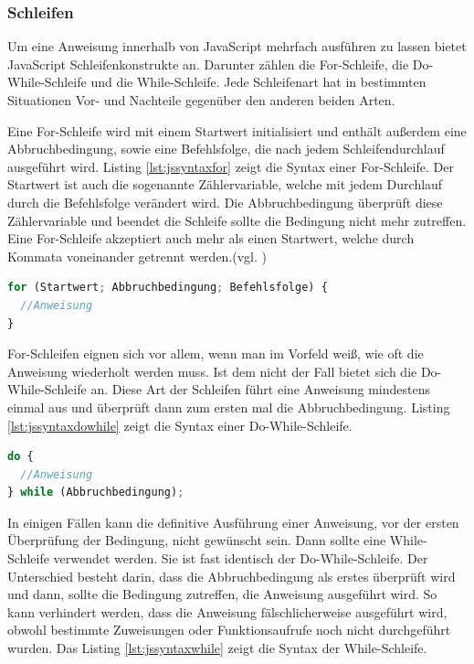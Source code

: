\subsubsection{Schleifen} Um eine Anweisung innerhalb von JavaScript mehrfach ausführen zu lassen bietet JavaScript Schleifenkonstrukte an. Darunter zählen die For-Schleife, die Do-While-Schleife und die While-Schleife. Jede Schleifenart hat in bestimmten Situationen Vor- und Nachteile gegenüber den anderen beiden Arten.\par Eine For-Schleife wird mit einem Startwert initialisiert und enthält außerdem eine Abbruchbedingung, sowie eine Befehlsfolge, die nach jedem Schleifendurchlauf ausgeführt wird. Listing \ref{lst:jssyntaxfor} zeigt die Syntax einer For-Schleife. Der Startwert ist auch die sogenannte Zählervariable, welche mit jedem Durchlauf durch die Befehlsfolge verändert wird. Die Abbruchbedingung überprüft diese Zählervariable und beendet die Schleife sollte die Bedingung nicht mehr zutreffen. Eine For-Schleife akzeptiert auch mehr als einen Startwert, welche durch Kommata voneinander getrennt werden.(vgl. \cite[S.75f]{WenzJava2008})

\vspace{1em}
\begin{lstlisting}[language=JavaScript, caption=Syntax For-Schleife, label=lst:jssyntaxfor]
for (Startwert; Abbruchbedingung; Befehlsfolge) {
  //Anweisung
}
\end{lstlisting}
	
For-Schleifen eignen sich vor allem, wenn man im Vorfeld weiß, wie oft die Anweisung wiederholt werden muss. Ist dem nicht der Fall bietet sich die Do-While-Schleife an. Diese Art der Schleifen führt eine Anweisung mindestens einmal aus und überprüft dann zum ersten mal die Abbruchbedingung. Listing \ref{lst:jssyntaxdowhile} zeigt die Syntax einer Do-While-Schleife.

\vspace{1em}
\begin{lstlisting}[language=JavaScript, caption=Syntax Do-While-Schleife, label=lst:jssyntaxdowhile]
do {
  //Anweisung
} while (Abbruchbedingung);
\end{lstlisting}

In einigen Fällen kann die definitive Ausführung einer Anweisung, vor der ersten Überprüfung der Bedingung, nicht gewünscht sein. Dann sollte eine While-Schleife verwendet werden. Sie ist fast identisch der Do-While-Schleife. Der Unterschied besteht darin, dass die Abbruchbedingung als erstes überprüft wird und dann, sollte die Bedingung zutreffen, die Anweisung ausgeführt wird. So kann verhindert werden, dass die Anweisung fälschlicherweise ausgeführt wird, obwohl bestimmte Zuweisungen oder Funktionsaufrufe noch nicht durchgeführt wurden. Das Listing \ref{lst:jssyntaxwhile} zeigt die Syntax der While-Schleife.

